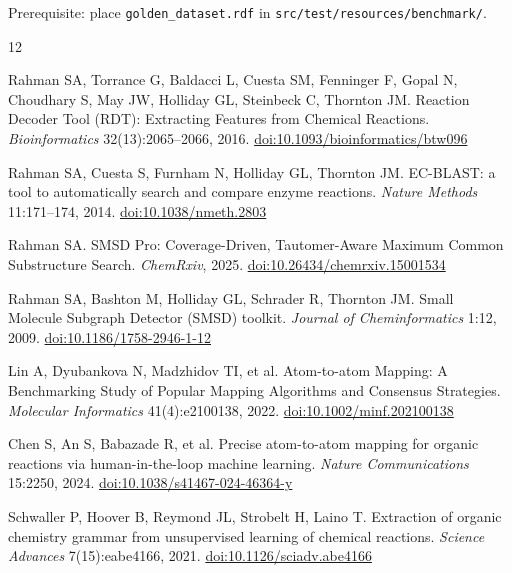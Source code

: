 \documentclass[11pt,a4paper]{article}
\begin{document}
Prerequisite: place \texttt{golden\_dataset.rdf} in
\texttt{src/test/resources/benchmark/}.


\begin{thebibliography}{12}

Rahman SA, Torrance G, Baldacci L, Cuesta SM, Fenninger F, Gopal N, Choudhary S,
May JW, Holliday GL, Steinbeck C, Thornton JM.
Reaction Decoder Tool (RDT): Extracting Features from Chemical Reactions.
\textit{Bioinformatics} 32(13):2065--2066, 2016.
\href{https://doi.org/10.1093/bioinformatics/btw096}{doi:10.1093/bioinformatics/btw096}

Rahman SA, Cuesta S, Furnham N, Holliday GL, Thornton JM.
EC-BLAST: a tool to automatically search and compare enzyme reactions.
\textit{Nature Methods} 11:171--174, 2014.
\href{https://doi.org/10.1038/nmeth.2803}{doi:10.1038/nmeth.2803}

Rahman SA.
SMSD Pro: Coverage-Driven, Tautomer-Aware Maximum Common Substructure Search.
\textit{ChemRxiv}, 2025.
\href{https://doi.org/10.26434/chemrxiv.15001534}{doi:10.26434/chemrxiv.15001534}

Rahman SA, Bashton M, Holliday GL, Schrader R, Thornton JM.
Small Molecule Subgraph Detector (SMSD) toolkit.
\textit{Journal of Cheminformatics} 1:12, 2009.
\href{https://doi.org/10.1186/1758-2946-1-12}{doi:10.1186/1758-2946-1-12}

Lin A, Dyubankova N, Madzhidov TI, et al.
Atom-to-atom Mapping: A Benchmarking Study of Popular Mapping Algorithms and
Consensus Strategies.
\textit{Molecular Informatics} 41(4):e2100138, 2022.
\href{https://doi.org/10.1002/minf.202100138}{doi:10.1002/minf.202100138}

Chen S, An S, Babazade R, et al.
Precise atom-to-atom mapping for organic reactions via human-in-the-loop
machine learning.
\textit{Nature Communications} 15:2250, 2024.
\href{https://doi.org/10.1038/s41467-024-46364-y}{doi:10.1038/s41467-024-46364-y}

Schwaller P, Hoover B, Reymond JL, Strobelt H, Laino T.
Extraction of organic chemistry grammar from unsupervised learning of chemical
reactions.
\textit{Science Advances} 7(15):eabe4166, 2021.
\href{https://doi.org/10.1126/sciadv.abe4166}{doi:10.1126/sciadv.abe4166}


\end{thebibliography}
\end{document}
